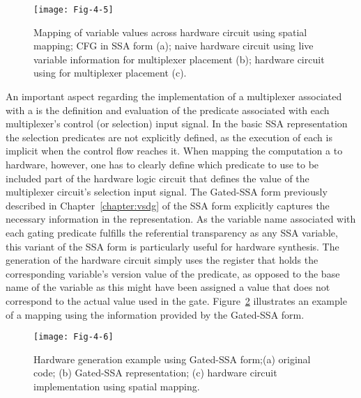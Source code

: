 \begin{figure}[htbp]
\centering
\texttt{[image: Fig-4-5]}
\caption{Mapping of variable values across hardware circuit using spatial mapping; 
  CFG in SSA form (a); 
  naive hardware circuit using live variable information for multiplexer placement (b); 
  hardware circuit using \phifun for multiplexer placement (c).}
\label{fig:Fig.4.5}
\end{figure}

An important aspect regarding the implementation of a multiplexer associated with a \phifun is the definition and evaluation of the predicate associated with each multiplexer's control (or selection) input signal. 
In the basic SSA representation the selection predicates are not explicitly defined, as the execution of each \phifun is implicit when the control flow reaches it. 
When mapping the computation a \phifun to hardware, however, one has to clearly define which predicate to use to be included part of the hardware logic circuit that defines the value of the multiplexer circuit's selection input signal. 
The Gated-SSA form previously described in Chapter~\ref{chapter:vsdg} of the SSA form explicitly captures the necessary information in the representation. 
As the variable name associated with each gating predicate fulfills the referential transparency as any SSA variable, this variant of the SSA form is particularly useful for hardware synthesis. 
The generation of the hardware circuit simply uses the register that holds the corresponding variable's version value of the predicate, as opposed to the base name of the variable as this might have been assigned a value that does not correspond to the actual value used in the gate. 
Figure~\ref{fig:Fig.4.6} illustrates an example of a mapping using the information provided by the Gated-SSA form.

\begin{figure}[htbp]
\centering
\texttt{[image: Fig-4-6]}
\caption{Hardware generation example using Gated-SSA form;\newline (a) original 
code; (b) Gated-SSA representation; (c) hardware circuit implementation 
using spatial mapping.}
\label{fig:Fig.4.6}
\end{figure}

